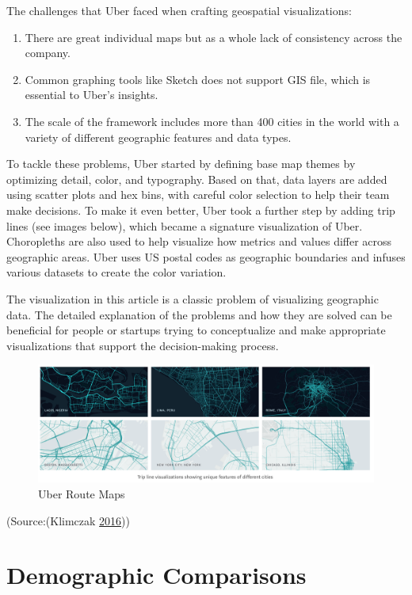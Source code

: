\documentclass[]{book}
\providecommand{\tightlist}{%
  \setlength{\itemsep}{0pt}\setlength{\parskip}{0pt}}
\theoremstyle{definition}
\theoremstyle{definition}
\theoremstyle{definition}
\theoremstyle{remark}
\begin{document}
The challenges that Uber faced when crafting geospatial visualizations:

\begin{enumerate}
\def\labelenumi{\arabic{enumi}.}
\tightlist
\item
  There are great individual maps but as a whole lack of consistency
  across the company.
\item
  Common graphing tools like Sketch does not support GIS file, which is
  essential to Uber's insights.
\item
  The scale of the framework includes more than 400 cities in the world
  with a variety of different geographic features and data types.
\end{enumerate}

To tackle these problems, Uber started by defining base map themes by
optimizing detail, color, and typography. Based on that, data layers are
added using scatter plots and hex bins, with careful color selection to
help their team make decisions. To make it even better, Uber took a
further step by adding trip lines (see images below), which became a
signature visualization of Uber. Choropleths are also used to help
visualize how metrics and values differ across geographic areas. Uber
uses US postal codes as geographic boundaries and infuses various
datasets to create the color variation.

The visualization in this article is a classic problem of visualizing
geographic data. The detailed explanation of the problems and how they
are solved can be beneficial for people or startups trying to
conceptualize and make appropriate visualizations that support the
decision-making process.

\begin{figure}
\centering
\includegraphics{images/uber_mapping.png}
\caption{Uber Route Maps}
\end{figure}

(Source:(Klimczak \protect\hyperlink{ref-uber_maps}{2016}))

\section{Demographic Comparisons}\label{demographic-comparisons}
\end{document}
